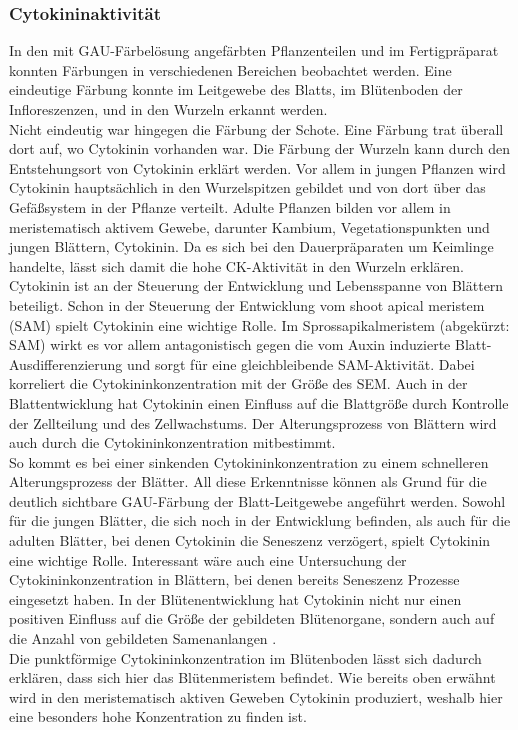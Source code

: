 \documentclass[10pt,a4paper]{article}
\begin{document}
	\subsubsection{Cytokininaktivität}
	In den mit GAU-Färbelösung angefärbten Pflanzenteilen und im Fertigpräparat konnten Färbungen in verschiedenen Bereichen beobachtet werden. Eine eindeutige Färbung konnte im Leitgewebe des Blatts, im Blütenboden der Infloreszenzen, und in den Wurzeln erkannt werden. \\
	Nicht eindeutig war hingegen die Färbung der Schote. Eine Färbung trat überall dort auf, wo Cytokinin vorhanden war. Die Färbung der Wurzeln kann durch den Entstehungsort von Cytokinin erklärt werden. Vor allem in jungen Pflanzen wird Cytokinin hauptsächlich in den Wurzelspitzen gebildet und von dort über das Gefäßsystem in der Pflanze verteilt. Adulte Pflanzen bilden vor allem in meristematisch aktivem Gewebe, darunter Kambium, Vegetationspunkten und jungen Blättern, Cytokinin\cite{Schopfer}. Da es sich bei den Dauerpräparaten um Keimlinge handelte, lässt sich damit die hohe CK-Aktivität in den Wurzeln erklären. Cytokinin  ist an der Steuerung der Entwicklung und Lebensspanne von Blättern beteiligt. Schon in der Steuerung der Entwicklung vom shoot apical meristem (SAM) spielt Cytokinin eine wichtige Rolle. Im Sprossapikalmeristem (abgekürzt: SAM) wirkt es vor allem antagonistisch gegen die vom Auxin induzierte Blatt-Ausdifferenzierung und sorgt für eine gleichbleibende SAM-Aktivität. Dabei korreliert die Cytokininkonzentration mit der Größe des SEM. Auch in der Blattentwicklung hat Cytokinin einen Einfluss auf die Blattgröße durch Kontrolle der Zellteilung und des Zellwachstums. Der Alterungsprozess von Blättern wird auch durch die Cytokininkonzentration mitbestimmt. \\
	So kommt es bei einer sinkenden Cytokininkonzentration zu einem schnelleren Alterungsprozess der Blätter\cite{Wu_Wenqi;}. All diese Erkenntnisse können als Grund für die deutlich sichtbare GAU-Färbung der Blatt-Leitgewebe angeführt werden. Sowohl für die jungen Blätter, die sich noch in der Entwicklung befinden, als auch für die adulten Blätter, bei denen Cytokinin die Seneszenz verzögert, spielt Cytokinin eine wichtige Rolle. Interessant wäre auch eine Untersuchung der Cytokininkonzentration in Blättern, bei denen bereits Seneszenz Prozesse eingesetzt haben. In der Blütenentwicklung hat Cytokinin nicht nur einen positiven Einfluss auf die Größe der gebildeten Blütenorgane, sondern auch auf die Anzahl von gebildeten Samenanlangen \cite{Cytokininregulation}. \\
	Die punktförmige Cytokininkonzentration im Blütenboden lässt sich dadurch erklären, dass sich hier das Blütenmeristem befindet. Wie bereits oben erwähnt wird in den meristematisch aktiven Geweben Cytokinin produziert, weshalb hier eine besonders hohe Konzentration zu finden ist.
	
\end{document}
